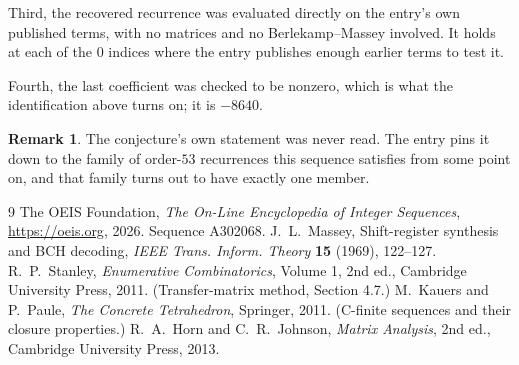 \documentclass[11pt,a4paper]{article}
\theoremstyle{plain}
\theoremstyle{definition}
\newtheorem{remark}[theorem]{Remark}
\begin{document}
Third, the recovered recurrence was evaluated directly on the entry's own published terms, with
no matrices and no Berlekamp--Massey involved. It holds at each of the $0$ indices where
the entry publishes enough earlier terms to test it.

Fourth, the last coefficient was checked to be nonzero, which is what the identification above
turns on; it is $-8640$.

\begin{remark}
The conjecture's own statement was never read. The entry pins it down to the family of
order-$53$ recurrences this sequence satisfies from some point on, and that family turns
out to have exactly one member.
\end{remark}

\begin{thebibliography}{9}
 The OEIS Foundation, \emph{The On-Line Encyclopedia of Integer
Sequences}, \url{https://oeis.org}, 2026. Sequence A302068.
 J.~L.~Massey, Shift-register synthesis and BCH decoding, \emph{IEEE
Trans. Inform. Theory} \textbf{15} (1969), 122--127.
 R.~P.~Stanley, \emph{Enumerative Combinatorics}, Volume 1, 2nd ed.,
Cambridge University Press, 2011. (Transfer-matrix method, Section 4.7.)
 M.~Kauers and P.~Paule, \emph{The Concrete Tetrahedron}, Springer, 2011.
(C-finite sequences and their closure properties.)
 R.~A.~Horn and C.~R.~Johnson, \emph{Matrix Analysis}, 2nd ed., Cambridge
University Press, 2013.
\end{thebibliography}
\end{document}
